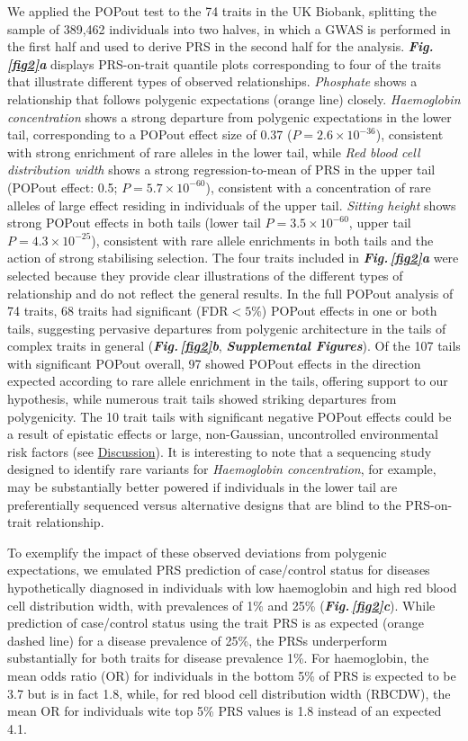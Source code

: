 \documentclass[12pt]{zHenriquesLab-StyleBioRxiv}
\newcommand{\myemph}[1]{\textbf{\textit{#1}}}
\newcommand\dref[2]{\normalsize{\textbf{\textit{Fig.\,\ref{#1}#2}}}\normalsize{}}
\begin{document}
%
We applied the POPout test to the 74 traits in the UK Biobank, 
splitting the sample of 389,462 individuals into two halves, 
in which a GWAS is performed in the first half and used to derive 
PRS in the second half for the analysis. 
\dref{fig2}{a}  displays PRS-on-trait quantile plots corresponding 
to four of the traits that illustrate different types of 
observed relationships. \emph{Phosphate} shows a relationship that 
follows polygenic expectations (orange line) closely. 
\emph{Haemoglobin concentration} shows a strong departure from 
polygenic expectations in the lower tail, corresponding 
to a POPout effect size of 0.37 ($P = 2.6 \times 10^{-36}$), 
consistent with strong enrichment of rare alleles in the lower 
tail, while \emph{Red blood cell distribution width} shows a strong 
regression-to-mean of PRS in the upper tail (POPout effect: 
0.5; $P = 5.7 \times 10^{-60}$), consistent with a concentration
of rare alleles of large effect residing in individuals of 
the upper tail.
\emph{Sitting height} shows strong POPout effects in both 
tails (lower tail $P = 3.5 \times 10^{-60}$, upper 
tail $P = 4.3 \times 10^{-25}$), consistent with rare allele 
enrichments in both tails and the action of strong 
stabilising selection. The four traits included in \dref{fig2}{a} 
were selected because they provide clear illustrations 
of the different types of relationship and do not reflect 
the general results. In the full POPout analysis of 74 traits, 
68 traits had significant (FDR$<5\%$) POPout effects in one or both 
tails, suggesting pervasive departures from polygenic 
architecture in the tails of complex traits in 
general (\dref{fig2}{b}, \myemph{Supplemental Figures}). Of the 107 tails with significant 
POPout overall, 97 showed POPout effects in the 
direction expected according to rare allele enrichment 
in the tails, offering support to our hypothesis, while 
numerous trait tails showed striking departures from polygenicity. 
The 10 trait tails with significant negative POPout effects 
could be a result of epistatic effects or large, non-Gaussian, 
uncontrolled environmental risk factors (see \hyperref[sec:discussion]{Discussion}). 
It is interesting to note that a sequencing study designed 
to identify rare variants for \emph{Haemoglobin concentration}, 
for example, may be substantially better powered if 
individuals in the lower tail are preferentially sequenced 
versus alternative designs that are blind to the PRS-on-trait 
relationship.

To exemplify the impact of these observed deviations from 
polygenic expectations, we emulated PRS prediction of 
case/control status for diseases hypothetically diagnosed 
in individuals with low haemoglobin and high red blood cell 
distribution width, with prevalences of 1\% and 25\% (\dref{fig2}{c}). 
While prediction of case/control status using the trait PRS 
is as expected (orange dashed line) for a disease prevalence 
of 25\%, the PRSs underperform substantially for both 
traits for disease prevalence 1\%. For haemoglobin, the mean 
odds ratio (OR) for individuals in the bottom 5\% of PRS is 
expected to be 3.7 but is in fact 1.8, while, for red blood 
cell distribution width (RBCDW), the mean OR for individuals 
wite top 5\% PRS values is 1.8 instead of an expected 4.1.
%
\end{document}
